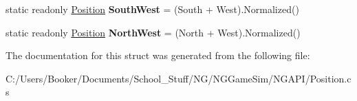 \begin{DoxyCompactItemize}
\item 
\mbox{\label{struct_n_g_a_p_i_1_1_position_a829b350e4832ecd37393a4b8cfa129d3}} 
static readonly \hyperlink{struct_n_g_a_p_i_1_1_position}{Position} {\bfseries South\+West} = (South + West).Normalized()
\item 
\mbox{\label{struct_n_g_a_p_i_1_1_position_ac37a3ea81f453fa0b3eb068a5919406e}} 
static readonly \hyperlink{struct_n_g_a_p_i_1_1_position}{Position} {\bfseries North\+West} = (North + West).Normalized()
\end{DoxyCompactItemize}


The documentation for this struct was generated from the following file\+:\begin{DoxyCompactItemize}
\item 
C\+:/\+Users/\+Booker/\+Documents/\+School\+\_\+\+Stuff/\+N\+G/\+N\+G\+Game\+Sim/\+N\+G\+A\+P\+I/Position.\+cs\end{DoxyCompactItemize}
